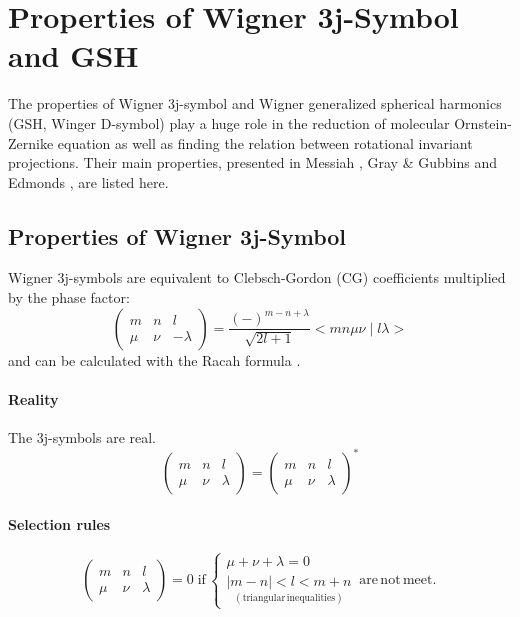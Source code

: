 
\chapter{Properties of Wigner 3j-Symbol and GSH \label{chpt:symmetry}}

The properties of Wigner 3j-symbol and Wigner generalized spherical
harmonics (\acs{GSH}, Winger D-symbol) play a huge role in the reduction
of molecular Ornstein-Zernike equation as well as finding the relation
between rotational invariant projections. Their main properties, presented
in Messiah \citep{Messiah}, Gray \& Gubbins \citep{Gray-Gubbins}
and Edmonds \citep{Edmonds}, are listed here.

\section{Properties of Wigner 3j-Symbol}

Wigner 3j-symbols are equivalent to Clebsch-Gordon (CG) coefficients
multiplied by the phase factor:
\begin{equation}
\left(\begin{array}{ccc}
m & n & l\\
\mu & \nu & -\lambda
\end{array}\right)=\frac{\left(-\right)^{m-n+\lambda}}{\sqrt{2l+1}}<mn\mu\nu\mid l\lambda>
\end{equation}
and can be calculated with the Racah formula \citep{Messiah}.

\subsubsection*{Reality}

The 3j-symbols are real.
\begin{equation}
\left(\begin{array}{ccc}
m & n & l\\
\mu & \nu & \lambda
\end{array}\right)=\left(\begin{array}{ccc}
m & n & l\\
\mu & \nu & \lambda
\end{array}\right)^{*}
\end{equation}


\subsubsection*{Selection rules}

\begin{equation}
\left(\begin{array}{ccc}
m & n & l\\
\mu & \nu & \lambda
\end{array}\right)=0\;\mathrm{if}\,\left\{ \begin{array}{l}
\mu+\nu+\lambda=0\\
\underset{\mathrm{(triangular\,inequalities)}}{\left|m-n\right|<l<m+n}
\end{array}\right.\,\mathrm{are\,not\,meet.}\,
\end{equation}


